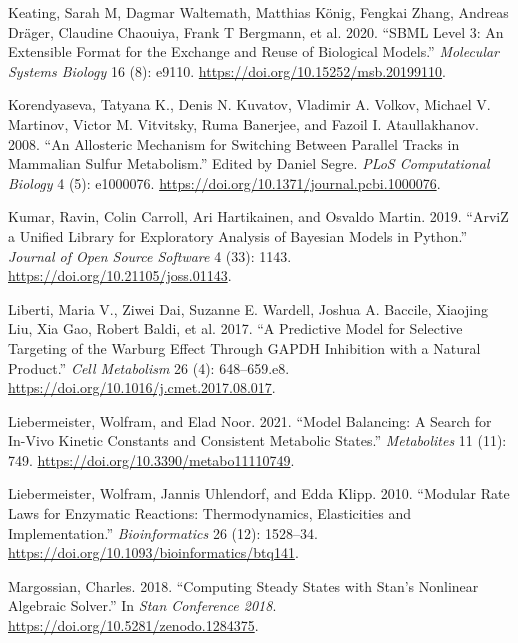 \documentclass[
  letterpaper,
  DIV=11,
  numbers=noendperiod]{scrartcl}
\newlength{\cslhangindent}
\newlength{\cslentryspacingunit} %
\newenvironment{CSLReferences}[2] %
 {%
  \setlength{\parindent}{0pt}
  \ifodd #1
  \let\oldpar\par
  \def\par{\hangindent=\cslhangindent\oldpar}
  \fi
  \setlength{\parskip}{#2\cslentryspacingunit}
 }%
 {}
\begin{document}
\begin{CSLReferences}{1}{0}
\leavevmode{}%
Keating, Sarah M, Dagmar Waltemath, Matthias König, Fengkai Zhang,
Andreas Dräger, Claudine Chaouiya, Frank T Bergmann, et al. 2020.
{``{\textsc{SBML}} {Level} 3: An Extensible Format for the Exchange and
Reuse of Biological Models.''} \emph{Molecular Systems Biology} 16 (8):
e9110. \url{https://doi.org/10.15252/msb.20199110}.

\leavevmode{}%
Korendyaseva, Tatyana K., Denis N. Kuvatov, Vladimir A. Volkov, Michael
V. Martinov, Victor M. Vitvitsky, Ruma Banerjee, and Fazoil I.
Ataullakhanov. 2008. {``An {Allosteric} {Mechanism} for {Switching}
Between {Parallel} {Tracks} in {Mammalian} {Sulfur} {Metabolism}.''}
Edited by Daniel Segre. \emph{PLoS Computational Biology} 4 (5):
e1000076. \url{https://doi.org/10.1371/journal.pcbi.1000076}.

\leavevmode{}%
Kumar, Ravin, Colin Carroll, Ari Hartikainen, and Osvaldo Martin. 2019.
{``{ArviZ} a Unified Library for Exploratory Analysis of {Bayesian}
Models in {Python}.''} \emph{Journal of Open Source Software} 4 (33):
1143. \url{https://doi.org/10.21105/joss.01143}.

\leavevmode{}%
Liberti, Maria V., Ziwei Dai, Suzanne E. Wardell, Joshua A. Baccile,
Xiaojing Liu, Xia Gao, Robert Baldi, et al. 2017. {``A {Predictive}
{Model} for {Selective} {Targeting} of the {Warburg} {Effect} Through
{GAPDH} {Inhibition} with a {Natural} {Product}.''} \emph{Cell
Metabolism} 26 (4): 648--659.e8.
\url{https://doi.org/10.1016/j.cmet.2017.08.017}.

\leavevmode{}%
Liebermeister, Wolfram, and Elad Noor. 2021. {``Model {Balancing}: {A}
{Search} for {In}-{Vivo} {Kinetic} {Constants} and {Consistent}
{Metabolic} {States}.''} \emph{Metabolites} 11 (11): 749.
\url{https://doi.org/10.3390/metabo11110749}.

\leavevmode{}%
Liebermeister, Wolfram, Jannis Uhlendorf, and Edda Klipp. 2010.
{``Modular Rate Laws for Enzymatic Reactions: Thermodynamics,
Elasticities and Implementation.''} \emph{Bioinformatics} 26 (12):
1528--34. \url{https://doi.org/10.1093/bioinformatics/btq141}.

\leavevmode{}%
Margossian, Charles. 2018. {``Computing Steady States with {Stan}'s
Nonlinear Algebraic Solver.''} In \emph{Stan {Conference} 2018}.
\url{https://doi.org/10.5281/zenodo.1284375}.


\end{CSLReferences}
\end{document}
